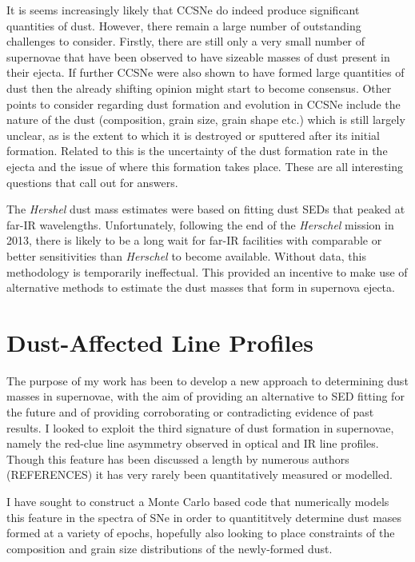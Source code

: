 It is seems increasingly likely that CCSNe do indeed produce significant quantities of dust.  However, there remain a large number of outstanding challenges to consider.  Firstly, there are still only a very small number of supernovae that have been observed to have sizeable masses of dust present in their ejecta.  If further CCSNe were also shown to have formed large quantities of dust then  the already shifting opinion might start to become consensus.  Other points to consider regarding dust formation and evolution in CCSNe include the nature of the dust (composition, grain size, grain shape etc.) which is still largely unclear, as is the extent to which it is destroyed or sputtered after its initial formation.  Related to this is the uncertainty of the dust formation rate in the ejecta and the issue of where this formation takes place.  These are all interesting questions that call out for answers.  

The {\em Hershel} dust mass estimates were based on fitting dust SEDs that peaked at far-IR wavelengths. Unfortunately, following the end of the {\em Herschel} mission in 2013, there is likely to be a long wait for far-IR facilities with comparable or better sensitivities than {\em Herschel} to become available.  Without data, this methodology is temporarily ineffectual.  This provided an incentive to make use of alternative methods to estimate the dust masses that form in supernova ejecta.

\section{Dust-Affected Line Profiles}


The purpose of my work has been to develop a new approach to determining dust masses in supernovae, with the aim of providing an alternative to SED fitting for the future and of providing corroborating or contradicting evidence of past results.  I looked to exploit the third signature of dust formation in supernovae, namely the red-clue line asymmetry observed in optical and IR line profiles.  Though this feature has been discussed a length by numerous authors (REFERENCES) it has very rarely been quantitatively measured or modelled.

I have sought to construct a Monte Carlo based code that numerically models this feature in the spectra of SNe in order to quantititvely determine dust mases formed at a variety of epochs, hopefully also looking to place constraints of the composition and grain size distributions of the newly-formed dust.

